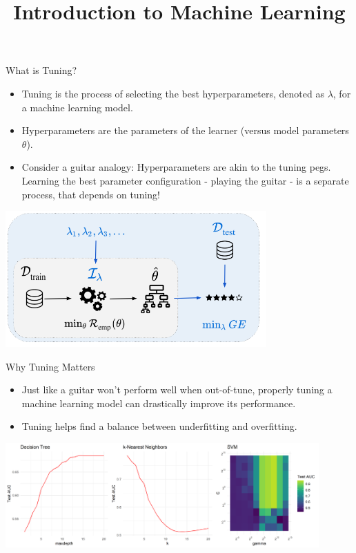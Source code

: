 \documentclass[11pt,compress,t,notes=noshow, xcolor=table]{beamer}
\title{Introduction to Machine Learning}
\date{}
\begin{document}
	
	\sloppy
	
	\begin{vbframe}{What is Tuning?}
		\begin{itemize}
			\item \small Tuning is the process of selecting the best hyperparameters, denoted as $\lambda$, for a machine learning model.
			\item \small Hyperparameters are the parameters of the learner (versus model parameters $\theta$).
			\item \small Consider a guitar analogy: Hyperparameters are akin to the tuning pegs. Learning the best parameter configuration - playing the guitar - is a separate process, that depends on tuning!
		\end{itemize}
		
	 
		\begin{center}
			\includegraphics[width = 0.75\textwidth]{figure_man/riskmin_bilevel3.png}
		\end{center}
		
	\end{vbframe}
	
	\begin{vbframe}{Why Tuning Matters}
		\begin{itemize}
			\item \small Just like a guitar won't perform well when out-of-tune, properly tuning a machine learning model can drastically improve its performance.
			\item \small Tuning helps find a balance between underfitting and overfitting.
		\end{itemize}
		
		\begin{center}
			\vspace{3em}
			\includegraphics[width = 0.9\textwidth]{figure/tuning_importance.png}
		\end{center}
		
	\end{vbframe}
	
\end{document}
